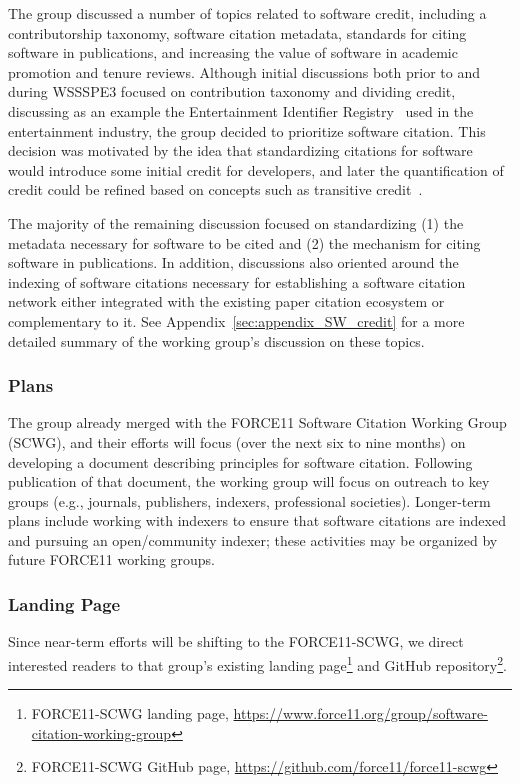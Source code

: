 The group discussed a number of topics related to software credit, including a
contributorship taxonomy, software citation metadata, standards for citing
software in publications, and increasing the value of software in academic
promotion and tenure reviews. Although initial discussions both prior to and
during WSSSPE3 focused on contribution taxonomy and dividing credit, discussing
as an example the Entertainment Identifier Registry~\cite{EIDR} used in the
entertainment industry, the group decided to prioritize software citation. This
decision was motivated by the idea that standardizing citations for software
would introduce some initial credit for developers, and later the quantification
of credit could be refined based on concepts such as transitive
credit~\cite{wssspe2_katz,Katz:2014_tc}.

The majority of the remaining discussion focused on standardizing (1) the
metadata necessary for software to be cited and (2) the mechanism for citing
software in publications. In addition, discussions also oriented around the
indexing of software citations necessary for establishing a software citation
network either integrated with the existing paper citation ecosystem or
complementary to it. See Appendix~\ref{sec:appendix_SW_credit} for a more
detailed summary of the working group's discussion on these topics.

\subsubsection{Plans}

The group already merged with the FORCE11 Software Citation Working Group
(SCWG), and their efforts will focus (over the next six to nine months) on
developing a document describing principles for software citation. Following
publication of that document, the working group will focus on outreach to key
groups (e.g., journals, publishers, indexers, professional societies).
Longer-term plans include working with indexers to ensure that software
citations are indexed and pursuing an open\slash community indexer; these
activities may be organized by future FORCE11 working groups.

\subsubsection{Landing Page}

Since near-term efforts will be shifting to the FORCE11-SCWG, we direct
interested readers to that group's existing landing page\footnote{FORCE11-SCWG
landing page,
\url{https://www.force11.org/group/software-citation-working-group}} and GitHub
repository\footnote{FORCE11-SCWG GitHub page,
\url{https://github.com/force11/force11-scwg}}.
